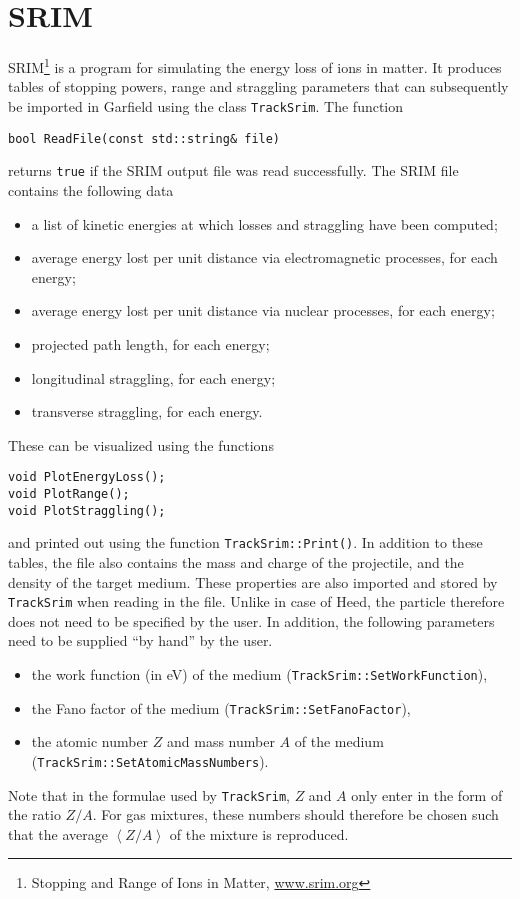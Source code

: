 \section{SRIM}
SRIM\footnote{Stopping and Range of Ions in Matter, \href{www.srim.org}{www.srim.org}} is a program for simulating the energy loss of ions in matter. 
It produces tables of stopping powers, range and straggling parameters that 
can subsequently be imported in Garfield using the class \texttt{TrackSrim}. 
The function
\begin{lstlisting}
bool ReadFile(const std::string& file)
\end{lstlisting}
returns \texttt{true} if the SRIM output file was read successfully.
The SRIM file contains the following data
\begin{itemize}
\item
a list of kinetic energies at which losses and straggling have been computed;
\item
average energy lost per unit distance via electromagnetic processes, for each energy;
\item
average energy lost per unit distance via nuclear processes, for each energy;
\item
projected path length, for each energy;
\item
longitudinal straggling, for each energy;
\item
transverse straggling, for each energy.
\end{itemize}
These can be visualized using the functions
\begin{lstlisting}
void PlotEnergyLoss();
void PlotRange();
void PlotStraggling();
\end{lstlisting}
and printed out using the function \texttt{TrackSrim::Print()}.
In addition to these tables, the file also contains the mass and charge of 
the projectile, and the density of the target medium.
These properties are also imported and stored by \texttt{TrackSrim} 
when reading in the file. Unlike in case of Heed, the particle therefore 
does not need to be specified by the user. 
In addition, the following parameters need to be supplied ``by hand'' by the 
user.
\begin{itemize}
  \item
  the work function (in eV) of the medium (\texttt{TrackSrim::SetWorkFunction}),
  \item
  the Fano factor of the medium (\texttt{TrackSrim::SetFanoFactor}),
  \item
  the atomic number $Z$ and mass number $A$ of the medium (\texttt{TrackSrim::SetAtomicMassNumbers}).
\end{itemize}
Note that in the formulae used by \texttt{TrackSrim}, $Z$ and $A$ only enter in the 
form of the ratio $Z/A$. For gas mixtures, these numbers should therefore be chosen 
such that the average $\left<Z/A\right>$ of the mixture is reproduced. 


